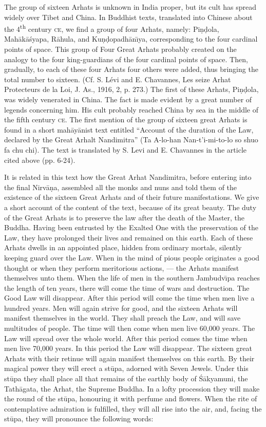 \documentclass[a4paper, 12pt, oneside]{article}
\begin{document}
The group of sixteen Arhats is unknown in India proper, but its cult has spread widely over Tibet and China. In Buddhist texts, translated into Chinese about the 4\textsuperscript{th} century \textsc{ce}, we find a group of four Arhats, namely: Pi\d{n}\d{d}ola, Mah\={a}k\={a}\'{s}yapa, R\={a}hula, and Ku\d{n}\d{d}opadh\={a}n\={\i}ya, corresponding to the four cardinal points of space. This group of Four Great Arhats probably created on the analogy to the four king-guardians of the four cardinal points of space. Then, gradually, to each of these four Arhats four others were added, thus bringing the total number to sixteen. (Cf. S. Lévi and E. Chavannes, Les seize Arhat Protecteurs de la Loi, J. As., 1916, 2, p. 273.) The first of these Arhats, Pi\d{n}\d{d}ola, was widely venerated in China. The fact is made evident by a great number of legends concerning him. His cult probably reached China by sea in the middle of the fifth century \textsc{ce}. The first mention of the group of sixteen great Arhats is found in a short mah\={a}y\={a}nist text entitled ``Account of the duration of the Law, declared by the Great Arhalt Nandimitra'' (Ta A-lo-han Nan-t'i-mi-to-lo so shuo fa chu chi). The text is translated by S. Levi and E. Chavannes in the article cited above (pp. 6-24).

It is related in this text how the Great Arhat Nandimitra, before entering into the final Nirv\={a}\d{n}a, assembled all the monks and nuns and told them of the existence of the sixteen Great Arhats and of their future manifestations. We give a short account of the content of the text, because of its great beauty. The duty of the Great Arhats is to preserve the law after the death of the Master, the Buddha. Having been entrusted by the Exalted One with the preservation of the Law, they have prolonged their lives and remained on this earth. Each of these Arhats dwells in an appointed place, hidden from ordinary mortals, silently keeping guard over the Law. When in the mind of pious people originates a good thought or when they perform meritorious actions, --- the Arhats manifest themselves unto them. When the life of men in the southern Jambudv\={\i}pa reaches the length of ten years, there will come the time of wars and destruction. The Good Law will disappear. After this period will come the time when men live a hundred years. Men will again strive for good, and the sixteen Arhats will manifest themselves in the world. They shall preach the Law, and will save multitudes of people. The time will then come when men live 60,000 years. The Law will spread over the whole world. After this period comes the time when men live 70,000 years. In this period the Law will disappear. The sixteen great Arhats with their retinue will again manifest themselves on this earth. By their magical power they will erect a st\={u}pa, adorned with Seven Jewels. Under this st\={u}pa they shall place all that remains of the earthly body of \'{S}\={a}kyamuni, the Tath\={a}gata, the Arhat, the Supreme Buddha. In a lofty procession they will make the round of the st\={u}pa, honouring it with perfume and flowers. When the rite of contemplative admiration is fulfilled, they will all rise into the air, and, facing the st\={u}pa, they will pronounce the following words:
\end{document}
